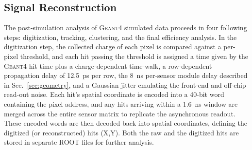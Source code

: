 \subsection{Signal Reconstruction}\label{sec:reco}
The post-simulation analysis of \textsc{Geant4} simulated data proceeds in four following steps: digitization, tracking, clustering, and the final efficiency analysis. In the digitization step, the collected charge of each pixel is compared against a per-pixel threshold, and each hit passing the threshold is assigned a time given by the \textsc{Geant4} hit time plus a charge-dependent time-walk, a row-dependent propagation delay of \SI{12.5}{\pico\second} per row, the \SI{8}{\nano\second} per-sensor module delay described in Sec.~\ref{sec:geometry}, and a Gaussian jitter emulating the front-end and off-chip read-out noise. Each hit's spatial coordinate is encoded into a 40-bit word containing the pixel address, and any hits arriving within a \SI{1.6}{\nano\second} window are merged across the entire sensor matrix to replicate the asynchronous readout. These encoded words are then decoded back into spatial coordinates, defining the digitized (or reconstructed) hits (X,Y). Both the raw and the digitized hits are stored in separate ROOT files for further analysis. 

